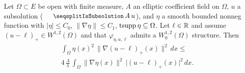 \begin{theorem}
\label{thm:caccioppoli_weighted_of_subsolution}
\leanok
{}
Let $\Omega \subset E$ be open with finite measure, $A$ an elliptic
coefficient field on $\Omega$, $u$ a subsolution
($\leanname{IsSubsolution}\, A\, u$), and $\eta$ a smooth bounded
nonneg function with $|\eta| \le C_0$, $\|\nabla \eta\| \le C_1$,
$\mathrm{tsupp}\,\eta \subseteq \Omega$.  Let $\ell \in \mathbb{R}$ and assume
$(u - \ell)_+ \in W^{1,2}(\Omega)$ and that $\varphi_{\eta,u,\ell}$
admits a $W^{1,2}_0(\Omega)$ structure.  Then
\begin{multline*}
  \int_\Omega \eta(x)^2 \, \bigl\| \nabla(u-\ell)_+(x) \bigr\|^2 \, dx
   \le \\
   4\, \frac{\Lambda}{\lambda}\,
     \int_\Omega \|\nabla \eta(x)\|^2 \,
       \bigl|(u-\ell)_+(x)\bigr|^2 \, dx.
\end{multline*}
\end{theorem}

